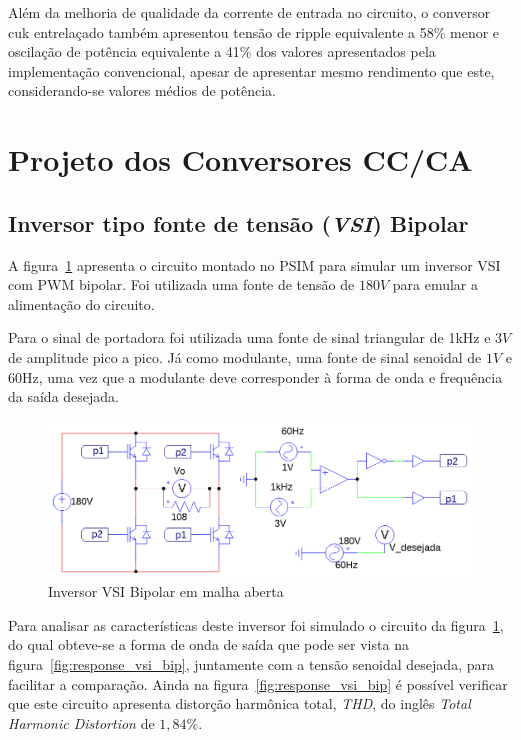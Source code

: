 \documentclass[
	12pt,				%
	openright,			%
	twoside,			%
	a4paper,			%
	english,			%
	french,				%
	spanish,			%
	brazil,				%
	]{abntex2}
\begin{document}
Além da melhoria de qualidade da corrente de entrada no circuito, o conversor cuk entrelaçado também apresentou tensão de ripple equivalente a 58\% menor e oscilação de potência equivalente a 41\% dos valores apresentados pela implementação convencional, apesar de apresentar mesmo rendimento que este, considerando-se valores médios de potência.

\section{Projeto dos Conversores CC/CA} \label{sec:met_conv_cc_ca}

\subsection{Inversor tipo fonte de tensão (\textit{VSI}) Bipolar}

A figura~\ref{fig:VSI_bip_circ} apresenta o circuito montado no PSIM para simular um inversor VSI com PWM bipolar. Foi utilizada uma fonte de tensão de $180V$ para emular a alimentação do circuito.

Para o sinal de portadora foi utilizada uma fonte de sinal triangular de 1kHz e $3V$ de amplitude pico a pico. Já como modulante, uma fonte de sinal senoidal de $1V$ e 60Hz, uma vez que a modulante deve corresponder à forma de onda e frequência da saída desejada.

\begin{figure}[htpb]%
	\centering%
		\includegraphics[width=0.8 \linewidth]{vsi_bipolar_psim_circ}
		\caption{Inversor VSI Bipolar em malha aberta}
		\label{fig:VSI_bip_circ}
\end{figure}

Para analisar as características deste inversor foi simulado o circuito da figura~\ref{fig:VSI_bip_circ}, do qual obteve-se a forma de onda de saída que pode ser vista na figura~\ref{fig:response_vsi_bip}, juntamente com a tensão senoidal desejada, para facilitar a comparação. Ainda na figura~\ref{fig:response_vsi_bip} é possível verificar que este circuito apresenta distorção harmônica total, \emph{THD}, do inglês \textit{Total Harmonic Distortion} de $1,84\%$.
\end{document}
